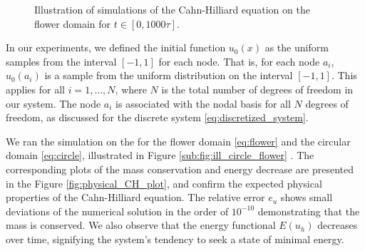 \begin{figure}[]
    \vspace{10pt}
    \hfill
    \hfill
    \caption{Illustration of simulations of the Cahn-Hilliard equation on the flower domain for $t\in \left[ 0, 1000\tau  \right] $.}
\end{figure}



In our experiments, we defined the initial function $u_{0}(x)$ as the uniform samples from the interval $[-1, 1]$ for each node. That is, for each node $a_{i}$, $u_{0}(a_{i})$ is a sample from the uniform distribution on the interval $[-1, 1]$. This
applies for all $i = 1, \ldots, N$, where $N$ is the total number of degrees of freedom in our system. The node $a_{i}$ is associated with the nodal basis for all $N$ degrees of freedom, as discussed for the discrete system \eqref{eq:discretized_system}.

We ran the simulation on the for the flower domain \eqref{eq:flower} and the circular domain \eqref{eq:circle}, illustrated in Figure \ref{sub:fig:ill_circle_flower} . The corresponding plots of the mass conservation and energy decrease are presented
in the Figure \ref{fig:physical_CH_plot}, and confirm the expected physical properties of the Cahn-Hilliard equation. The relative error $e_{u}$ shows small deviations of the numerical solution in the order of $10^{ -10 }$ demonstrating that the mass is conserved. We also observe that the energy functional
$E(u_h)$ decreases over time, signifying the system's tendency to seek a state of minimal energy.


